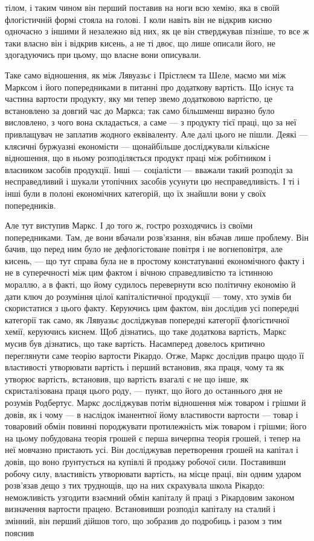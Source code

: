 тілом, і таким чином він перший поставив на ноги всю хемію, яка в
своїй флогістичній формі стояла на голові. І коли навіть він не відкрив
кисню одночасно з іншими й незалежно від них, як це він стверджував
пізніше, то все ж таки власно він і відкрив кисень, а не ті двоє, що
лише описали його, не здогадуючись при цьому, що власне вони
описували.

Таке само відношення, як між Лявуазьє і Прістлеєм та Шеле, маємо
ми між Марксом і його попередниками в питанні про додаткову вартість.
Що існує та частина вартости продукту, яку ми тепер звемо додатковою
вартістю, це встановлено за довгий час до Маркса; так само більшменш
виразно було висловлено, з чого вона складається, а саме —
з продукту тієї праці, що за неї привлащувач не заплатив жодного еквіваленту.
Але далі цього не пішли. Деякі — клясичні буржуазні економісти —
щонайбільше досліджували кількісне відношення, що в ньому розподіляється
продукт праці між робітником і власником засобів продукції.
Інші — соціалісти — вважали такий розподіл за несправедливий і шукали
утопічних засобів усунути цю несправедливість. І ті і інші були в полоні
економічних категорій, що їх знайшли вони у своїх попередників.

Але тут виступив Маркс. І до того ж, гостро розходячись із своїми
попередниками. Там, де вони вбачали розв’язання, він вбачав лише
проблему. Він бачив, що перед ним було не дефлогістоване повітря і не
вогнеповітря, але кисень, — що тут справа була не в простому констатуванні
економічного факту і не в суперечності між цим фактом і вічною
справедливістю та істинною мораллю, а в факті, що йому судилось
перевернути всю політичну економію й дати ключ до розуміння цілої
капіталістичної продукції — тому, хто зумів би скористатися з цього
факту. Керуючись цим фактом, він дослідив усі попередні категорії так
само, як Лявуазьє досліджував попередні категорії флогістичної хемії, керуючись
киснем. Щоб дізнатись, що таке додаткова вартість, Маркс мусив
був дізнатись, що таке вартість. Насамперед довелось критично переглянути
саме теорію вартости Рікардо. Отже, Маркс дослідив працю щодо її
властивості утворювати вартість і перший встановив, яка праця, чому та
як утворює вартість, встановив, що вартість взагалі є не що інше, як
скристалізована праця цього роду, — пункт, що його до останнього дня не
розумів Родбертус. Маркс досліджував потім відношення між товаром і
грішми й довів, як і чому — в наслідок іманентної йому властивости вартости —
товар і товаровий обмін повинні породжувати протилежність між товаром
і грішми; його на цьому побудована теорія грошей є перша вичерпна
теорія грошей, і тепер на неї мовчазно пристають усі. Він досліджував
перетворення грошей на капітал і довів, що воно ґрунтується на купівлі
й продажу робочої сили. Поставивши робочу силу, властивість утворювати
вартість, на місце праці, він одним ударом розв’язав дещо з тих
труднощів, що на них скрахувала школа Рікардо: неможливість узгодити
взаємний обмін капіталу й праці з Рікардовим законом визначення вартости
працею. Встановивши розподіл капіталу на сталий і змінний, він
перший дійшов того, що зобразив до подробиць і разом з тим пояснив
